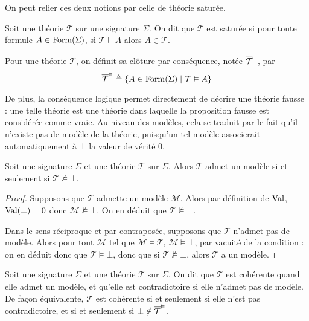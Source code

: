 On peut relier ces deux notions par celle de théorie saturée.

\begin{definition}
  Soit une théorie $\mathcal T$ sur une signature $\Sigma$. On dit que
  $\mathcal T$ est saturée si pour toute formule $A\in\operatorname{Form}(\Sigma)$,
  si $\mathcal T\vDash A$ alors $A\in \mathcal T$.

  Pour une théorie $\mathcal T$, on définit sa clôture par conséquence, notée
  $\overline{\mathcal T}^{\vDash}$, par
  \[\overline{\mathcal T}^{\vDash} \triangleq \{ A \in \operatorname{Form}(\Sigma)
  \mid \mathcal T \vDash A\}\]
\end{definition}

De plus, la conséquence logique permet directement de décrire une théorie
\og fausse\fg{} : une telle théorie est une théorie dans laquelle la proposition
fausse est considérée comme vraie. Au niveau des modèles, cela se traduit par le
fait qu'il n'existe pas de modèle de la théorie, puisqu'un tel modèle
associerait automatiquement à $\bot$ la valeur de vérité $0$.

\begin{proposition}
  Soit une signature $\Sigma$ et une théorie $\mathcal T$ sur $\Sigma$. Alors
  $\mathcal T$ admet un modèle si et seulement si $\mathcal T \not\vDash \bot$.
\end{proposition}

\begin{proof}
  Supposons que $\mathcal T$ admette un modèle $\mathcal M$. Alors par
  définition de $\operatorname{Val}$, $\operatorname{Val}(\bot) = 0$ donc $\mathcal M\not\models \bot$. On
  en déduit que $\mathcal T\not\vDash\bot$.

  Dans le sens réciproque et par contraposée, supposons que $\mathcal T$ n'admet
  pas de modèle. Alors pour tout $\mathcal M$ tel que
  $\mathcal M\models \mathcal T$, $\mathcal M\models \bot$, par vacuité de la
  condition : on en déduit donc que $\mathcal T \vDash \bot$, donc que si
  $\mathcal T \not\vDash\bot$, alors $\mathcal T$ a un modèle.
\end{proof}

\begin{definition}
  Soit une signature $\Sigma$ et une théorie $\mathcal T$ sur $\Sigma$. On dit
  que $\mathcal T$ est cohérente quand elle admet un modèle, et qu'elle est
  contradictoire si elle n'admet pas de modèle. De façon équivalente,
  $\mathcal T$ est cohérente si et seulement si elle n'est pas contradictoire,
  et si et seulement si $\bot\notin\overline{\mathcal T}^{\vDash}$.
\end{definition}

